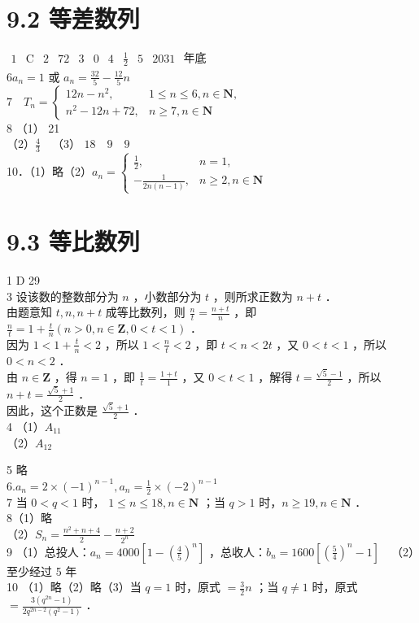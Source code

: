 \documentclass[10pt]{article}
\begin{document}
\section*{9.2 等差数列}
\(\begin{array}{llllllllll}1 & \mathrm{C} & 2 & 72 & 3 & 0 & 4 & \frac{1}{2} & 5 & 2031\end{array}\) 年底\\
\(6 a_{n}=1\) 或 \(a_{n}=\frac{32}{5}-\frac{12}{5} n\)\\
\(7 \quad T_{n}= \begin{cases}12 n-n^{2}, & 1 \leqslant n \leqslant 6, n \in \mathbf{N}, \\ n^{2}-12 n+72, & n \geqslant 7, n \in \mathbf{N}\end{cases}\)\\
8 （1） 21\\
（2）\(\frac{4}{3} \quad\)（3） \(18 \quad 9 \quad 9\)\\
10．（1）略（2）\(a_{n}= \begin{cases}\frac{1}{2}, & n=1, \\ -\frac{1}{2 n(n-1)}, & n \geqslant 2, n \in \mathbf{N}\end{cases}\)

\section*{9.3 等比数列}
1 D 29\\
3 设该数的整数部分为 \(n\) ，小数部分为 \(t\) ，则所求正数为 \(n+t\) ．\\
由题意知 \(t, n, n+t\) 成等比数列，则 \(\frac{n}{t}=\frac{n+t}{n}\) ，即 \(\frac{n}{t}=1+\frac{t}{n}(n>0, n \in \mathbf{Z}, 0<t<1)\) ．\\
因为 \(1<1+\frac{t}{n}<2\) ，所以 \(1<\frac{n}{t}<2\) ，即 \(t<n<2 t\) ，又 \(0<t<1\) ，所以 \(0<n<2\) ．\\
由 \(n \in \mathbf{Z}\) ，得 \(n=1\) ，即 \(\frac{1}{t}=\frac{1+t}{1}\) ，又 \(0<t<1\) ，解得 \(t=\frac{\sqrt{5}-1}{2}\) ，所以 \(n+t=\frac{\sqrt{5}+1}{2}\) ．\\
因此，这个正数是 \(\frac{\sqrt{5}+1}{2}\) ．\\
4 （1）\(A_{11}\)\\
（2）\(A_{12}\)

5 略\\
\(6 . a_{n}=2 \times(-1)^{n-1}, a_{n}=\frac{1}{2} \times(-2)^{n-1}\)\\
7 当 \(0<q<1\) 时， \(1 \leqslant n \leqslant 18, n \in \mathbf{N}\) ；当 \(q>1\) 时，\(n \geqslant 19, n \in \mathbf{N}\) ．\\
8（1）略\\
（2）\(S_{n}=\frac{n^{2}+n+4}{2}-\frac{n+2}{2^{n}}\)\\
9 （1）总投人：\(a_{n}=4000\left[1-\left(\frac{4}{5}\right)^{n}\right]\) ，总收人：\(b_{n}=1600\left[\left(\frac{5}{4}\right)^{n}-1\right] \quad\)（2）至少经过 5 年\\
10 （1）略（2）略（3）当 \(q=1\) 时，原式 \(=\frac{3}{2} n\) ；当 \(q \neq 1\) 时，原式 \(=\frac{3\left(q^{2 n}-1\right)}{2 q^{2 n-2}\left(q^{2}-1\right)}\) ．
\end{document}
